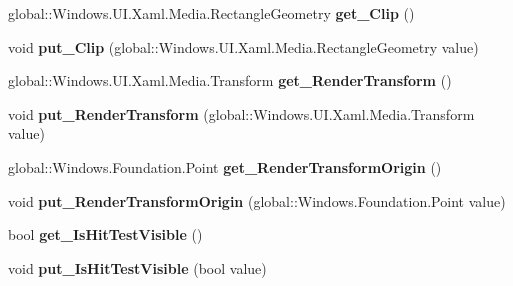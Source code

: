 \begin{DoxyCompactItemize}
global\+::\+Windows.\+U\+I.\+Xaml.\+Media.\+Rectangle\+Geometry {\bfseries get\+\_\+\+Clip} ()
\item 
\mbox{\label{interface_windows_1_1_u_i_1_1_xaml_1_1_i_u_i_element_afa52f92cfbfffd55b51a14f0f3174ebb}} 
void {\bfseries put\+\_\+\+Clip} (global\+::\+Windows.\+U\+I.\+Xaml.\+Media.\+Rectangle\+Geometry value)
\item 
\mbox{\label{interface_windows_1_1_u_i_1_1_xaml_1_1_i_u_i_element_ab552e7826e0d2d6d3c836b38db536820}} 
global\+::\+Windows.\+U\+I.\+Xaml.\+Media.\+Transform {\bfseries get\+\_\+\+Render\+Transform} ()
\item 
\mbox{\label{interface_windows_1_1_u_i_1_1_xaml_1_1_i_u_i_element_ac1ee0a38d70af19ef1629dff46ef59aa}} 
void {\bfseries put\+\_\+\+Render\+Transform} (global\+::\+Windows.\+U\+I.\+Xaml.\+Media.\+Transform value)
\item 
\mbox{\label{interface_windows_1_1_u_i_1_1_xaml_1_1_i_u_i_element_a5fa81294c9c6de8e157213ee727bd1c2}} 
global\+::\+Windows.\+Foundation.\+Point {\bfseries get\+\_\+\+Render\+Transform\+Origin} ()
\item 
\mbox{\label{interface_windows_1_1_u_i_1_1_xaml_1_1_i_u_i_element_a05d8af2ba53053be8810ef8ca2e32f36}} 
void {\bfseries put\+\_\+\+Render\+Transform\+Origin} (global\+::\+Windows.\+Foundation.\+Point value)
\item 
\mbox{\label{interface_windows_1_1_u_i_1_1_xaml_1_1_i_u_i_element_a08d625eccb089821ca78a7845cb5509c}} 
bool {\bfseries get\+\_\+\+Is\+Hit\+Test\+Visible} ()
\item 
\mbox{\label{interface_windows_1_1_u_i_1_1_xaml_1_1_i_u_i_element_aa80fb34be2e9e897b9dc8f558796ab51}} 
void {\bfseries put\+\_\+\+Is\+Hit\+Test\+Visible} (bool value)
\item 
\mbox{\label{interface_windows_1_1_u_i_1_1_xaml_1_1_i_u_i_element_a1d08cd5eebdac6a853903eb22a27b689}} 

\end{DoxyCompactItemize}
